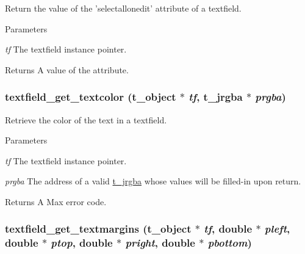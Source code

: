 Return the value of the 'selectallonedit' attribute of a textfield. 
\begin{DoxyParams}{Parameters}
\item[{\em tf}]The textfield instance pointer. \end{DoxyParams}
\begin{DoxyReturn}{Returns}
A value of the attribute. 
\end{DoxyReturn}
\hypertarget{group__textfield_ga6bbb44ffcaceb666d01ba9008c898fa9}{
\subsubsection[{textfield\_\-get\_\-textcolor}]{ textfield\_\-get\_\-textcolor ({\bf t\_\-object} $\ast$ {\em tf}, \/  {\bf t\_\-jrgba} $\ast$ {\em prgba})}}
\label{group__textfield_ga6bbb44ffcaceb666d01ba9008c898fa9}


Retrieve the color of the text in a textfield. 
\begin{DoxyParams}{Parameters}
\item[{\em tf}]The textfield instance pointer. \item[{\em prgba}]The address of a valid \hyperlink{structt__jrgba}{t\_\-jrgba} whose values will be filled-\/in upon return. \end{DoxyParams}
\begin{DoxyReturn}{Returns}
A Max error code. 
\end{DoxyReturn}
\hypertarget{group__textfield_ga36989910e25e20b150fc0a9d9988c2ca}{
\subsubsection[{textfield\_\-get\_\-textmargins}]{ textfield\_\-get\_\-textmargins ({\bf t\_\-object} $\ast$ {\em tf}, \/  double $\ast$ {\em pleft}, \/  double $\ast$ {\em ptop}, \/  double $\ast$ {\em pright}, \/  double $\ast$ {\em pbottom})}}
\label{group__textfield_ga36989910e25e20b150fc0a9d9988c2ca}



